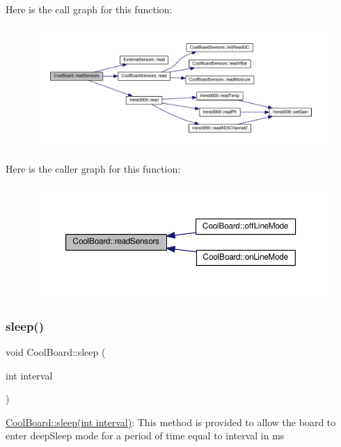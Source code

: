 Here is the call graph for this function\+:\nopagebreak
\begin{figure}[H]
\begin{center}
\leavevmode
\includegraphics[width=350pt]{classCoolBoard_ad03abdce2e65f520bbf2cff0f2d083cf_cgraph}
\end{center}
\end{figure}
Here is the caller graph for this function\+:\nopagebreak
\begin{figure}[H]
\begin{center}
\leavevmode
\includegraphics[width=350pt]{classCoolBoard_ad03abdce2e65f520bbf2cff0f2d083cf_icgraph}
\end{center}
\end{figure}
\mbox{\label{classCoolBoard_a5d0c8ff93b615efd676be432de9f164a}} 
\subsubsection{\texorpdfstring{sleep()}{sleep()}}
{\footnotesize\ttfamily void Cool\+Board\+::sleep (\begin{DoxyParamCaption}\item[{int}]{interval }\end{DoxyParamCaption})}

\hyperlink{classCoolBoard_a5d0c8ff93b615efd676be432de9f164a}{Cool\+Board\+::sleep(int interval)}\+: This method is provided to allow the board to enter deep\+Sleep mode for a period of time equal to interval in ms 

